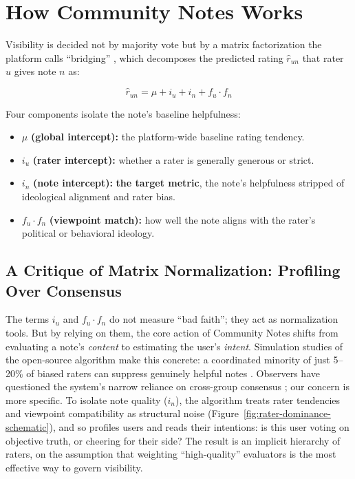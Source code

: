 \documentclass[10pt,twocolumn]{article}
\begin{document}
\section{How Community Notes Works}
\label{sec:how_cn_works}

Visibility is decided not by majority vote but by a matrix factorization the platform calls ``bridging'' \cite{wojcik2022birdwatch}, which decomposes the predicted rating $\hat{r}_{un}$ that rater $u$ gives note $n$ as:

\begin{equation}
    \hat{r}_{un} = \mu + i_u + i_n + f_u \cdot f_n
    \label{eq:cn-model}
\end{equation}

Four components isolate the note's baseline helpfulness:
\begin{itemize}[nosep]
    \item $\mu$ \textbf{(global intercept):} the platform-wide baseline rating tendency.
    \item $i_u$ \textbf{(rater intercept):} whether a rater is generally generous or strict.
    \item $i_n$ \textbf{(note intercept):} \textbf{the target metric}, the note's helpfulness stripped of ideological alignment and rater bias.
    \item $f_u \cdot f_n$ \textbf{(viewpoint match):} how well the note aligns with the rater's political or behavioral ideology.
\end{itemize}

\subsection*{A Critique of Matrix Normalization: Profiling Over Consensus}
The terms $i_u$ and $f_u \cdot f_n$ do not measure ``bad faith''; they act as normalization tools. But by relying on them, the core action of Community Notes shifts from evaluating a note's \textit{content} to estimating the user's \textit{intent}. Simulation studies of the open-source algorithm make this concrete: a coordinated minority of just 5--20\% of biased raters can suppress genuinely helpful notes \citep{truong2025vulnerable}. Observers have questioned the system's narrow reliance on cross-group consensus \citep{jude2025narrow}; our concern is more specific. To isolate note quality ($i_n$), the algorithm treats rater tendencies and viewpoint compatibility as structural noise (Figure~\ref{fig:rater-dominance-schematic}), and so profiles users and reads their intentions: is this user voting on objective truth, or cheering for their side? The result is an implicit hierarchy of raters, on the assumption that weighting ``high-quality'' evaluators is the most effective way to govern visibility.
\end{document}
